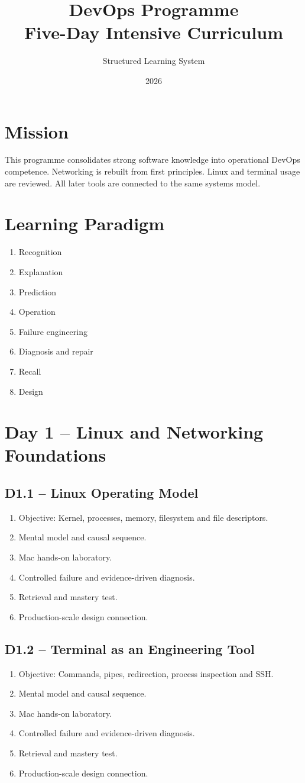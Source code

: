 \documentclass[11pt,a4paper]{book}
\title{DevOps Programme\\Five-Day Intensive Curriculum}
\author{Structured Learning System}
\date{2026}
\begin{document}
\maketitle
\tableofcontents
\chapter*{Mission}
This programme consolidates strong software knowledge into operational DevOps competence. Networking is rebuilt from first principles. Linux and terminal usage are reviewed. All later tools are connected to the same systems model.
\chapter{Learning Paradigm}
\begin{enumerate}
\item Recognition
\item Explanation
\item Prediction
\item Operation
\item Failure engineering
\item Diagnosis and repair
\item Recall
\item Design
\end{enumerate}
\chapter{Day 1 -- Linux and Networking Foundations}
\section{D1.1 -- Linux Operating Model}
\begin{enumerate}
\item Objective: Kernel, processes, memory, filesystem and file descriptors.
\item Mental model and causal sequence.
\item Mac hands-on laboratory.
\item Controlled failure and evidence-driven diagnosis.
\item Retrieval and mastery test.
\item Production-scale design connection.
\end{enumerate}
\section{D1.2 -- Terminal as an Engineering Tool}
\begin{enumerate}
\item Objective: Commands, pipes, redirection, process inspection and SSH.
\item Mental model and causal sequence.
\item Mac hands-on laboratory.
\item Controlled failure and evidence-driven diagnosis.
\item Retrieval and mastery test.
\item Production-scale design connection.
\end{enumerate}
\end{document}
